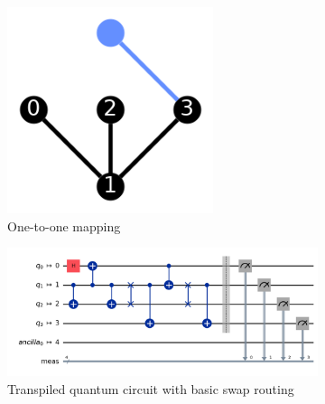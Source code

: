 \begin{figure}[htb]
    \begin{subfigure}{0.25\linewidth}
        \includegraphics[width=\linewidth]{image/coupling_map_trivial_basic.png}
        \caption{One-to-one mapping}
        \label{fig:one-to-one-mapping}
    \end{subfigure}
    \hfill
    \begin{subfigure}{0.7\linewidth}
        \includegraphics[width=\linewidth]{image/swap_trivial_basic.png}
        \caption{Transpiled quantum circuit with basic swap routing}
        \label{fig:swap-trivial-basic}
    \end{subfigure}
    \hfill
    \begin{subfigure}{0.25\linewidth}

\end{subfigure}
\end{figure}
